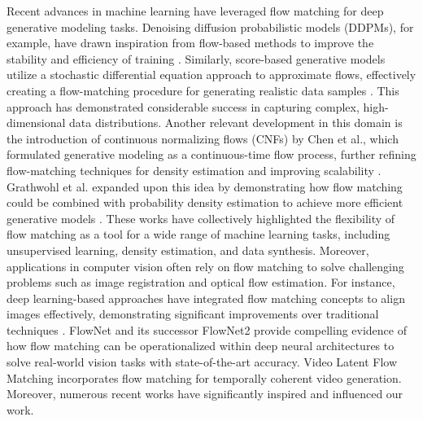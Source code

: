 Recent advances in machine learning have leveraged flow matching for deep generative modeling tasks. Denoising diffusion probabilistic models (DDPMs), for example, have drawn inspiration from flow-based methods to improve the stability and efficiency of training \cite{ho2020denoising}. Similarly, score-based generative models utilize a stochastic differential equation approach to approximate flows, effectively creating a flow-matching procedure for generating realistic data samples \cite{song2021score}. This approach has demonstrated considerable success in capturing complex, high-dimensional data distributions. Another relevant development in this domain is the introduction of continuous normalizing flows (CNFs) by Chen et al., which formulated generative modeling as a continuous-time flow process, further refining flow-matching techniques for density estimation and improving scalability \cite{chen2018neural}. Grathwohl et al. expanded upon this idea by demonstrating how flow matching could be combined with probability density estimation to achieve more efficient generative models \cite{grathwohl2018ffjord}. These works have collectively highlighted the flexibility of flow matching as a tool for a wide range of machine learning tasks, including unsupervised learning, density estimation, and data synthesis. Moreover, applications in computer vision often rely on flow matching to solve challenging problems such as image registration and optical flow estimation. For instance, deep learning-based approaches have integrated flow matching concepts to align images effectively, demonstrating significant improvements over traditional techniques \cite{dosovitskiy2015flownet, ilg2017flownet2}. FlowNet and its successor FlowNet2 provide compelling evidence of how flow matching can be operationalized within deep neural architectures to solve real-world vision tasks with state-of-the-art accuracy. Video Latent Flow Matching \cite{csy25,jsl+24,dsf23} incorporates flow matching for temporally coherent video generation.
Moreover, numerous recent works \cite{zcwt23,lss+24_relu,cls+24,lss+24_multi_layer,wxz+24,wcz+23,cgl+25_homo,xlc+24,wcy+23,sph+23,cxj24,fjl+24,kll+25,kll+25_tc,cll+25_var,kls+25_dpbloom,lsss24_dpntk,cll+25_deskrej,lssz24_gm,llss24_softmax,lzw+24,hwsl24,hwl+24,ssz+25_dit,ssz+25_prune} have significantly inspired and influenced our work.